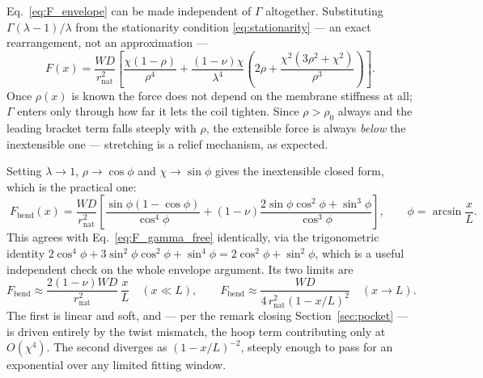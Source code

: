 \documentclass[11pt]{article}
\begin{document}
Eq.~\eqref{eq:F_envelope} can be made independent of $\Gamma$ altogether.
Substituting $\Gamma\left(\lambda-1\right)/\lambda$ from the stationarity
condition \eqref{eq:stationarity} --- an exact rearrangement, not an
approximation ---
\begin{equation}\label{eq:F_gamma_free}
    \boxed{\;F(x) = \frac{W D}{r_{\mathrm{nat}}^{2}}\left[
      \frac{\chi\left(1-\rho\right)}{\rho^{4}}
      + \frac{\left(1-\nu\right)\chi}{\lambda^{4}}
        \left(2\rho + \frac{\chi^{2}\left(3\rho^{2}+\chi^{2}\right)}
          {\rho^{3}}\right)\right].\;}
\end{equation}
Once $\rho(x)$ is known the force does not depend on the membrane stiffness at
all; $\Gamma$ enters only through how far it lets the coil tighten. Since
$\rho > \rho_0$ always and the leading bracket term falls steeply with $\rho$,
the extensible force is always \emph{below} the inextensible one --- stretching
is a relief mechanism, as expected.

Setting $\lambda \to 1$, $\rho \to \cos\phi$ and $\chi \to \sin\phi$ gives the
inextensible closed form, which is the practical one:
\begin{equation}\label{eq:F_bend_closed}
    \boxed{\;F_{\mathrm{bend}}(x)
      = \frac{W D}{r_{\mathrm{nat}}^{2}}\left[
        \frac{\sin\phi\left(1-\cos\phi\right)}{\cos^{4}\phi}
        + \left(1-\nu\right)
          \frac{2\sin\phi\cos^{2}\phi + \sin^{3}\phi}{\cos^{3}\phi}\right],
      \qquad \phi = \arcsin\frac{x}{L}.\;}
\end{equation}
This agrees with Eq.~\eqref{eq:F_gamma_free} identically, via the trigonometric
identity
$2\cos^{4}\phi + 3\sin^{2}\phi\cos^{2}\phi + \sin^{4}\phi
= 2\cos^{2}\phi + \sin^{2}\phi$, which is a useful independent check on the whole
envelope argument. Its two limits are
\begin{equation}\label{eq:F_bend_limits}
    F_{\mathrm{bend}} \approx
      \frac{2\left(1-\nu\right)W D}{r_{\mathrm{nat}}^{2}}\,\frac{x}{L}
      \quad \left(x \ll L\right),
    \qquad
    F_{\mathrm{bend}} \approx
      \frac{W D}{4\,r_{\mathrm{nat}}^{2}\left(1 - x/L\right)^{2}}
      \quad \left(x \to L\right).
\end{equation}
The first is linear and soft, and --- per the remark closing
Section~\ref{sec:pocket} --- is driven entirely by the twist mismatch,
the hoop term contributing only at $O\!\left(\chi^{4}\right)$. The second
diverges as $\left(1-x/L\right)^{-2}$, steeply enough to pass for an exponential
over any limited fitting window.
\end{document}
